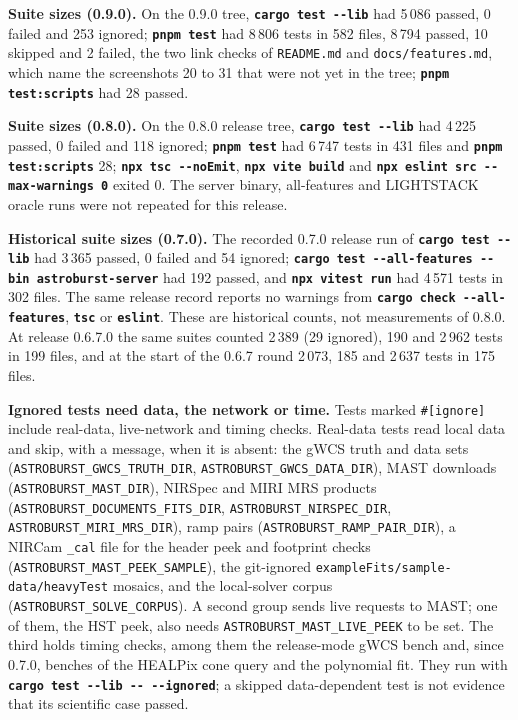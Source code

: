 \documentclass[11pt,a4paper]{article}
\newcommand{\code}[1]{\texttt{\small #1}}
\newcommand{\cmd}[1]{\texttt{\bfseries #1}}
\newcommand{\nLibTests}{3\,365}
\newcommand{\nLibIgnored}{54}
\newcommand{\nServerTests}{192}
\newcommand{\nVitestTests}{4\,571}
\newcommand{\nVitestFiles}{302}
\begin{document}
    \textbf{Suite sizes (0.9.0).} On the 0.9.0 tree, \cmd{cargo test -{}-lib} had 5\,086 passed, 0 failed and 253 ignored; \cmd{pnpm test} had 8\,806 tests in 582 files, 8\,794 passed, 10 skipped and 2 failed, the two link checks of \code{README.md} and \code{docs/features.md}, which name the screenshots 20 to 31 that were not yet in the tree; \cmd{pnpm test:scripts} had 28 passed.

    \textbf{Suite sizes (0.8.0).} On the 0.8.0 release tree, \cmd{cargo test -{}-lib} had 4\,225 passed, 0 failed and 118 ignored; \cmd{pnpm test} had 6\,747 tests in 431 files and \cmd{pnpm test:scripts} 28; \cmd{npx tsc -{}-noEmit}, \cmd{npx vite build} and \cmd{npx eslint src -{}-max-warnings 0} exited 0. The server binary, all-features and LIGHTSTACK oracle runs were not repeated for this release.

    \textbf{Historical suite sizes (0.7.0).} The recorded 0.7.0 release run of \cmd{cargo test -{}-lib} had \nLibTests{} passed, 0 failed and \nLibIgnored{} ignored; \cmd{cargo test -{}-all-features -{}-bin astroburst-server} had \nServerTests{} passed, and \cmd{npx vitest run} had \nVitestTests{} tests in \nVitestFiles{} files. The same release record reports no warnings from \cmd{cargo check -{}-all-features}, \cmd{tsc} or \cmd{eslint}. These are historical counts, not measurements of 0.8.0. At release 0.6.7.0 the same suites counted 2\,389 (29 ignored), 190 and 2\,962 tests in 199 files, and at the start of the 0.6.7 round 2\,073, 185 and 2\,637 tests in 175 files.

    \textbf{Ignored tests need data, the network or time.} Tests marked \code{\#[ignore]} include real-data, live-network and timing checks. Real-data tests read local data and skip, with a message, when it is absent: the gWCS truth and data sets (\code{ASTROBURST\_GWCS\_TRUTH\_DIR}, \code{ASTROBURST\_GWCS\_DATA\_DIR}), MAST downloads (\code{ASTROBURST\_MAST\_DIR}), NIRSpec and MIRI MRS products (\code{ASTROBURST\_DOCUMENTS\_FITS\_DIR}, \code{ASTROBURST\_NIRSPEC\_DIR}, \code{ASTROBURST\_MIRI\_MRS\_DIR}), ramp pairs (\code{ASTROBURST\_RAMP\_PAIR\_DIR}), a NIRCam \code{\_cal} file for the header peek and footprint checks (\code{ASTROBURST\_MAST\_PEEK\_SAMPLE}), the git-ignored \code{exampleFits/\allowbreak sample-data/\allowbreak heavyTest} mosaics, and the local-solver corpus (\code{ASTROBURST\_SOLVE\_CORPUS}). A second group sends live requests to MAST; one of them, the HST peek, also needs \code{ASTROBURST\_MAST\_LIVE\_PEEK} to be set. The third holds timing checks, among them the release-mode gWCS bench and, since 0.7.0, benches of the HEALPix cone query and the polynomial fit. They run with \cmd{cargo test -{}-lib -{}- -{}-ignored}; a skipped data-dependent test is not evidence that its scientific case passed.
\end{document}
